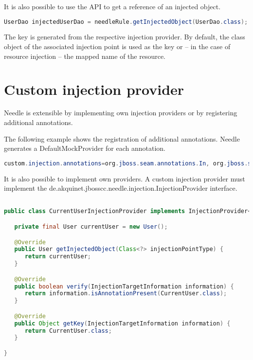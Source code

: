 It is also possible to use the API to get a reference of an injected object.

\begin{lstlisting}[language={JAVA},caption=Injected Components]
UserDao injectedUserDao = needleRule.getInjectedObject(UserDao.class);
\end{lstlisting}

The key is generated from the respective injection provider. By default, the class object of the associated injection point is used as the key or
-- in the case of resource injection -- the mapped name of the resource.


\section{Custom injection provider}
\label{sec:Custom injection provider}

Needle is extensible by implementing own injection providers or by registering additional annotations.

The following example shows the registration of additional annotations. Needle generates a DefaultMockProvider for each annotation.

\begin{lstlisting}[language={JAVA},caption=Additional Annotation]
custom.injection.annotations=org.jboss.seam.annotations.In, org.jboss.seam.annotations.Logger
\end{lstlisting}

It is also possible to implement own providers. A custom injection provider must implement the de.akquinet.jbosscc.needle.injection.InjectionProvider interface.

\begin{lstlisting}[language={JAVA},caption=javax.inject.Qualifier Injection Provider]

public class CurrentUserInjectionProvider implements InjectionProvider<User> {

   private final User currentUser = new User();

   @Override
   public User getInjectedObject(Class<?> injectionPointType) {
      return currentUser;
   }

   @Override
   public boolean verify(InjectionTargetInformation information) {
      return information.isAnnotationPresent(CurrentUser.class);
   }

   @Override
   public Object getKey(InjectionTargetInformation information) {
      return CurrentUser.class;
   }

}
\end{lstlisting}

